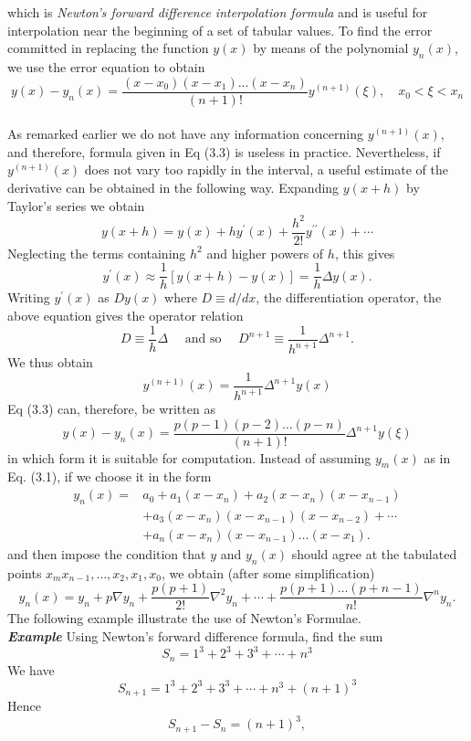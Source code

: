 \documentclass[12pt,a4paper,oneside]{book}
\begin{document}
which is \textit{Newton's forward difference interpolation formula} and is useful for interpolation near the beginning of a set of tabular values.
To find the error committed in replacing the function $y(x)$ by means of the polynomial $y_n(x)$, we use the error equation  to obtain
\begin{equation}\label{3.3}
	y(x)-y_n(x)=\frac{\left(x-x_0\right)\left(x-x_1\right) \ldots\left(x-x_n\right)}{(n+1) !} y^{(n+1)}(\xi), \quad x_0<\xi<x_n
\end{equation}\\[0.5cm]
As remarked earlier we do not have any information concerning $y^{(n+1)}(x)$, and therefore, formula given in Eq (3.3)  is useless in practice. Nevertheless,
if $y^{(n+1)}(x)$ does not vary too rapidly in the interval, a useful estimate of the derivative can be obtained in the following way. Expanding $y(x+h)$ by Taylor's series we obtain
$$
y(x+h)=y(x)+h y^{\prime}(x)+\frac{h^2}{2 !} y^{\prime \prime}(x)+\cdots
$$
Neglecting the terms containing $h^2$ and higher powers of $h$, this gives
$$
y^{\prime}(x) \approx \frac{1}{h}[y(x+h)-y(x)]=\frac{1}{h} \Delta y(x) .
$$
Writing $y^{\prime}(x)$ as $D y(x)$ where $D \equiv d / d x$, the differentiation operator, the above equation gives the operator relation
$$
D \equiv \frac{1}{h} \Delta \quad \text { and so } \quad D^{n+1} \equiv \frac{1}{h^{n+1}} \Delta^{n+1} .
$$
We thus obtain
\begin{equation}\label{3.4}
	y^{(n+1)}(x)=\frac{1}{h^{n+1}} \Delta^{n+1} y(x)
\end{equation}
Eq (3.3)  can, therefore, be written as
\begin{equation}\label{3.5}
	y(x)-y_n(x)=\frac{p(p-1)(p-2) \ldots(p-n)}{(n+1) !} \Delta^{n+1} y(\xi)
\end{equation}
in which form it is suitable for computation.
Instead of assuming $y_m(x)$ as in Eq. (3.1), if we choose it in the form
\begin{equation}\label{3.6}
	\begin{aligned}
		y_n(x)= & a_0+a_1\left(x-x_n\right)+a_2\left(x-x_n\right)\left(x-x_{n-1}\right) \\
		& +a_3\left(x-x_n\right)\left(x-x_{n-1}\right)\left(x-x_{n-2}\right)+\cdots \\
		& +a_n\left(x-x_n\right)\left(x-x_{n-1}\right) \ldots\left(x-x_1\right) .
	\end{aligned}
\end{equation}
and then impose the condition that $y$ and $y_n(x)$ should agree at the tabulated points $x_m x_{n-1}, \ldots, x_2, x_1, x_0$, we obtain (after some simplification)
\begin{equation}\label{3.7}
	y_n(x)=y_n+p \nabla y_n+\frac{p(p+1)}{2 !} \nabla^2 y_n+\cdots+\frac{p(p+1) \ldots(p+n-1)}{n !} \nabla^n y_n .
\end{equation}
The following example illustrate the use of Newton's Formulae. \\[0.4cm]
\textbf{\textit{Example}} Using Newton's forward difference formula, find the sum
$$
S_n=1^3+2^3+3^3+\cdots+n^3
$$
We have
$$
S_{n+1}=1^3+2^3+3^3+\cdots+n^3+(n+1)^3
$$
Hence
$$
S_{n+1}-S_n=(n+1)^3,
$$
\end{document}
